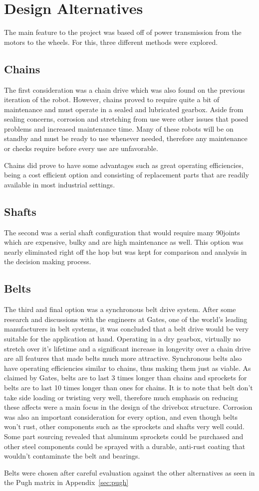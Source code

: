 \section {Design Alternatives}
The main feature to the project was based off of power transmission from the motors to the wheels. For this, three different methods were explored. 

\subsection{Chains}
The first consideration was a chain drive which was also found on the previous iteration of the robot. However, chains proved to require quite a bit of maintenance and must operate in a sealed and lubricated gearbox. Aside from sealing concerns, corrosion and stretching from use were other issues that posed problems and increased maintenance time. Many of these robots will be on standby and must be ready to use whenever needed, therefore any maintenance or checks require before every use are unfavorable. 

Chains did prove to have some advantages such as great operating efficiencies, being a cost efficient option and consisting of replacement parts that are readily available in most industrial settings.

\subsection{Shafts}
The second was a serial shaft configuration that would require many 90\degree joints which are expensive, bulky and are high maintenance as well. This option was nearly eliminated right off the hop but was kept for comparison and analysis in the decision making process. 

\subsection{Belts}
The third and final option was a synchronous belt drive system. After some research and discussions with the engineers at Gates, one of the world's leading manufacturers in belt systems, it was concluded that a belt drive would be very suitable for the application at hand. Operating in a dry gearbox, virtually no stretch over it's lifetime and a significant increase in longevity over a chain drive are all features that made belts much more attractive. Synchronous belts also have operating efficiencies similar to chains, thus making them just as viable. As claimed by Gates, belts are to last 3 times longer than chains and sprockets for belts are to last 10 times longer than ones for chains. It is to note that belt don't take side loading or twisting very well, therefore much emphasis on reducing these affects were a main focus in the design of the drivebox structure. Corrosion was also an important consideration for every option, and even though belts won't rust, other components such as the sprockets and shafts very well could. Some part sourcing revealed that aluminum sprockets could be purchased and other steel components could be sprayed with a durable, anti-rust coating that wouldn't contaminate the belt and bearings.

Belts were chosen after careful evaluation against the other alternatives as seen in the Pugh matrix in Appendix~\ref{sec:pugh}






